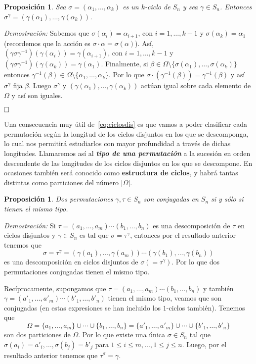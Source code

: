 \documentclass[12pt]{article}
\newtheorem{proposition}[theorem]{Proposición}
\begin{document}
\begin{proposition}Sea $\sigma = (\alpha_1, \ldots, \alpha_k)$ es un $k$-ciclo de $S_n$ y sea $\gamma \in S_n$. Entonces $\sigma^\gamma = (\gamma(\alpha_1), \ldots, \gamma(\alpha_k))$.
\end{proposition}
\emph{Demostración: }Sabemos que $\sigma(\alpha_i) = \alpha_{i+1}$, con $i=1, \ldots, k-1$ y $\sigma(\alpha_k)= \alpha_1$ (recordemos que la acción es $\sigma \cdot \alpha = \sigma(\alpha)$). Así, $(\gamma \sigma \gamma^{-1}) (\gamma(\alpha_i)) = \gamma(\alpha_{i+1})$, con $i=1, \ldots, k-1$ y $(\gamma \sigma \gamma^{-1}) (\gamma(\alpha_k)) = \gamma(\alpha_{1})$. Finalmente, si $\beta \in \Omega \setminus \lbrace \sigma(\alpha_1), \ldots, \sigma(\alpha_k) \rbrace$ entonces $\gamma^{-1}(\beta) \in \Omega \setminus \lbrace \alpha_1, \ldots, \alpha_k \rbrace$. Por lo que $\sigma \cdot (\gamma^{-1} (\beta)) = \gamma^{-1}(\beta)$ y así $\sigma^\gamma$ fija $\beta$. Luego $\sigma^\gamma$ y $(\gamma(\alpha_1), \ldots, \gamma(\alpha_k))$ actúan igual sobre cada elemento de $\Omega$ y así son iguales.

$\hfill \square$

Una consecuencia muy útil de~\ref{eq:ciclosdis} es que vamos a poder clasificar cada permutación según la longitud de los ciclos disjuntos en los que se descomponga, lo cual nos permitirá estudiarlos con mayor profundidad a través de dichas longitudes. Llamaremos así al \textbf{\textit{tipo de una permutación}} a la sucesión en orden descendente de las longitudes de los ciclos disjuntos en los que se descompone. En ocasiones también será conocido como \textbf{estructura de ciclos}, y habrá tantas distintas como particiones del número $|\Omega|$.

\begin{proposition}Dos permutaciones $\gamma, \tau \in S_{n}$ son conjugadas en $S_{n}$ si y sólo si tienen el mismo tipo.
\end{proposition}
\emph{Demostración: }
Si $\tau =(a_{1}, \ldots, a_{m})\cdots(b_{1}, \ldots, b_{n})$ es una descomposición de $\tau$ en ciclos disjuntos y $\gamma \in S_{n}$ es tal que $\sigma = \tau^\gamma$, entonces por el resultado anterior tenemos que $$\sigma = \tau^{\gamma}=(\gamma(a_{1}), \ldots, \gamma(a_{m})) \cdots (\gamma(b_{1}), \ldots, \gamma(b_{n}))$$ es una descomposición en ciclos disjuntos de $\sigma (=\tau^{\gamma})$. Por lo que dos permutaciones conjugadas tienen el mismo tipo.

Recíprocamente, supongamos que $\tau =(a_{1}, \ldots, a_{m}) \cdots(b_{1}, \ldots, b_{n})$ y también $\gamma = (a'_{1}, \ldots, a'_{m})\cdots(b'_{1}, \ldots, b'_{n})$ tienen el mismo tipo, veamos que son conjugadas (en estas expresiones se han incluido los $1$-ciclos también). Tenemos que $$\Omega = \lbrace a_{1}, \ldots, a_{m} \rbrace \cup \cdots \cup \lbrace b_{1}, \ldots, b_{n} \rbrace = \lbrace a'_{1}, \ldots, a'_{m} \rbrace \cup \cdots \cup \lbrace b'_{1}, \ldots, b'_{n} \rbrace$$
son dos particiones de $\Omega$. Por lo que existe una única $\sigma \in S_{n}$ tal que $\sigma(a_{i})=a'_{i}, \ldots, \sigma(b_{j})=b'_{j}$ para $1\leq i \leq m, \ldots, 1 \leq j \leq n$. Luego, por el resultado anterior tenemos que $\tau^{\sigma} = \gamma.$
\end{document}
